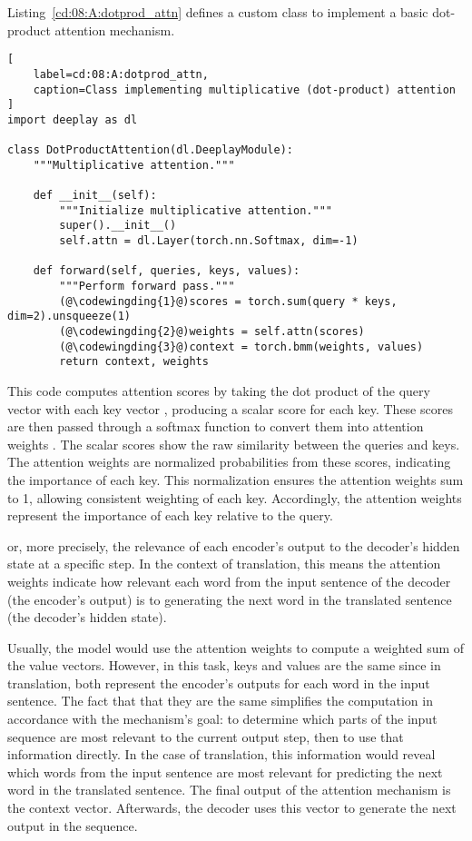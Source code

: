 Listing~\ref{cd:08:A:dotprod_attn} defines a custom class to implement a basic dot-product attention mechanism.
\begin{lstlisting}[
    label=cd:08:A:dotprod_attn,
    caption=Class implementing multiplicative (dot-product) attention
]
import deeplay as dl

class DotProductAttention(dl.DeeplayModule):
    """Multiplicative attention."""

    def __init__(self):
        """Initialize multiplicative attention."""
        super().__init__()
        self.attn = dl.Layer(torch.nn.Softmax, dim=-1)

    def forward(self, queries, keys, values):
        """Perform forward pass."""
        (@\codewingding{1}@)scores = torch.sum(query * keys, dim=2).unsqueeze(1)
        (@\codewingding{2}@)weights = self.attn(scores)
        (@\codewingding{3}@)context = torch.bmm(weights, values)
        return context, weights
\end{lstlisting}
This code computes attention scores by taking the dot product of the query vector with each key vector , producing a scalar score for each key. These scores are then passed through a softmax function to convert them into attention weights . 
The scalar scores show the raw similarity between the queries and keys. The attention weights are normalized probabilities from these scores, indicating the importance of each key. This normalization ensures the attention weights sum to 1, allowing consistent weighting of each key.
Accordingly, the attention weights represent the importance of each key relative to the query.

or, more precisely, the relevance of each encoder's output to the decoder's hidden state at a specific step.
In the context of translation, this means the attention weights indicate how relevant each word from the input sentence of the decoder (the encoder's output) is to generating the next word in the translated sentence (the decoder's hidden state).

Usually, the model would use the attention weights to compute a weighted sum of the value vectors. However, in this task, keys and values are the same  since in translation, both represent the encoder's outputs for each word in the input sentence. The fact that that they are the same simplifies the computation in accordance with the mechanism's goal: to determine which parts of the input sequence are most relevant to the current output step, then to use that information directly. In the case of translation, this information would reveal which words from the input sentence are most relevant for predicting the next word in the translated sentence.
The final output of the attention mechanism is the context vector. Afterwards, the decoder uses this vector to generate the next output in the sequence.


